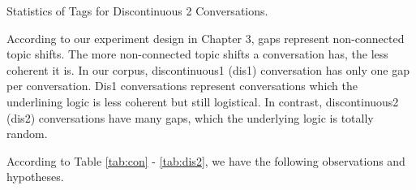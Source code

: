 \documentclass[bsc,frontabs,twoside,singlespacing,parskip,deptreport]{infthesis}     %
\begin{document}
\begin{minipage}{\textwidth}
\begin{minipage}[t]{0.45\textwidth}
        \end{minipage}
        \begin{minipage}[t]{0.45\textwidth}
        \centering
        \makeatletter{}\makeatother
{}
\caption{Statistics of Tags for Discontinuous 2  Conversations.}
\label{tab:dis2}

        \end{minipage}
    \end{minipage}



According to our experiment design in Chapter 3, gaps represent non-connected topic shifts. The more non-connected topic shifts a conversation has, the less coherent it is. In our corpus, discontinuous1 (dis1) conversation has only one gap per conversation. Dis1 conversations represent conversations which the underlining logic is less coherent but still logistical. In contrast, discontinuous2 (dis2) conversations have many gaps, which the underlying logic is totally random.  

According to Table \ref{tab:con} - \ref{tab:dis2}, we have the following observations and hypotheses.
\end{document}
